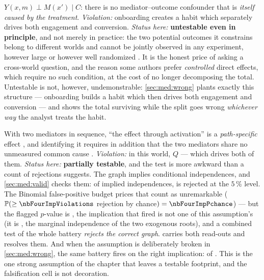 \begin{assumption}\label{as:med:crossworld}
$Y(x,m) \perp M(x') \mid C$: there is no mediator--outcome confounder that is \emph{itself caused by
the treatment}. \emph{Violation:} onboarding creates a habit which separately drives both engagement
and conversion. \emph{Status here:} \textbf{untestable even in principle}, and not merely in
practice: the two potential outcomes it constrains belong to different worlds and cannot be jointly
observed in any experiment, however large or however well randomized \citep{robins1992, imai2010}.
It is the honest price of asking a cross-world question, and the reason some authors prefer
\emph{controlled} direct effects, which require no such condition, at the cost of no longer
decomposing the total. Untestable is not, however, undemonstrable:
\cref{sec:med:wrong} plants exactly this structure --- onboarding builds a habit which then drives
both engagement and conversion --- and shows the total surviving while the split goes wrong
\emph{whichever way} the analyst treats the habit.
\end{assumption}

\begin{assumption}\label{as:med:mm}
With two mediators in sequence, ``the effect through activation'' is a \emph{path-specific} effect
\citep{avin2005}, and identifying it requires in addition that the two mediators share no unmeasured
common cause \citep{vanderweele2014mediators}. \emph{Violation:} in this world, $Q$ --- which drives
both of them. \emph{Status here:} \textbf{partially testable}, and the test is more awkward than a
count of rejections suggests. The graph implies conditional independences, and \cref{sec:med:valid}
checks them: of \nbFourImpTests{} implied independences, \nbFourImpViolations{} is rejected at the
$5\,\%$ level. The Binomial false-positive budget prices that count as unremarkable
($\Prob(\ge \nbFourImpViolations$ rejection by chance$) = \nbFourImpPchance$) --- but the flagged
$p$-value is \nbFourImpPFlagged, the implication that fired is not one of this assumption's
(it is \nbFourImpFlaggedPair, the marginal independence of the two exogenous roots), and a
combined test of the whole battery \emph{rejects the correct graph}.  carries
both read-outs and resolves them. And when the assumption is deliberately broken in
\cref{sec:med:wrong}, the same battery fires on the right implication:
\nbFourBadImpViolations{} of \nbFourBadImpTests. This is the one strong assumption
of the chapter that leaves a testable footprint, and the falsification cell is not decoration.
\end{assumption}


